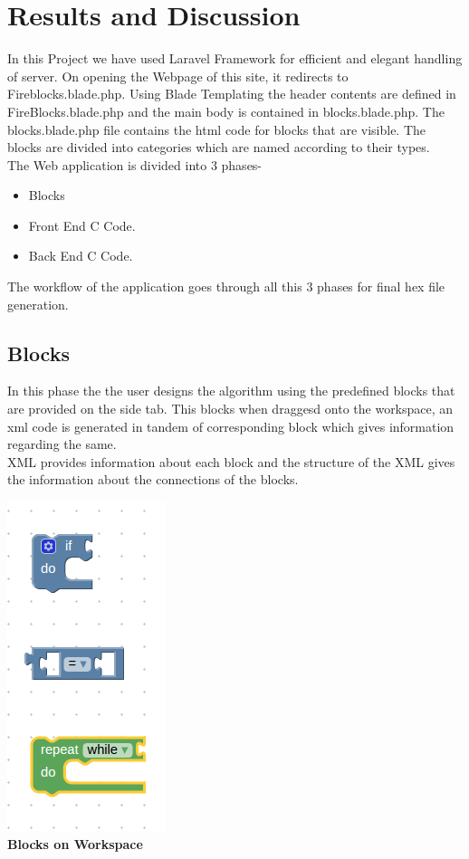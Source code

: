 \documentclass[a4paper,10pt]{report}
\begin{document}
\chapter{Results and Discussion}
    In this Project we have used Laravel Framework for efficient and elegant handling of server.
    On opening the Webpage of this site, it redirects to Fireblocks.blade.php. Using Blade Templating the header contents are defined in FireBlocks.blade.php
    and the main body is contained in blocks.blade.php. The blocks.blade.php file contains the html code for blocks that are visible.
    The blocks are divided into categories which are named according to their types. \\
    The Web application is divided into 3 phases-
    \begin{itemize}
     \item Blocks
     \item Front End C Code.
     \item Back End C Code.
    \end{itemize}
    The workflow of the application goes through all this 3 phases for final hex file generation.\\
   \section{Blocks}
    In this phase the the user designs the algorithm using the predefined blocks that are provided on the side tab.
    This blocks when draggesd onto the workspace, an xml code is generated in tandem of corresponding block which gives information regarding the same.\\
    XML provides information about each block and the structure of the XML  gives the information about the connections of the blocks.
    \begin{center}
    \includegraphics[scale =0.6]{images/blocks.png}\\[.3in]
    \textbf{Blocks on Workspace}\\[1.3in]
    \end{center}
\end{document}
